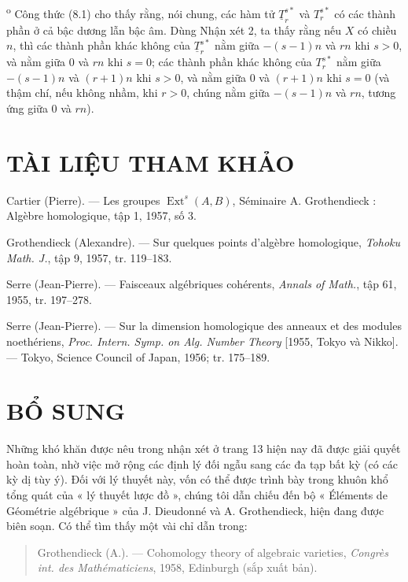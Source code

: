 \documentclass[11pt,twoside,openany]{book}
\numberwithin{equation}{section}
\newcommand{\src}[1]{%
  \phantomsection\hypertarget{src:\fgasourceid:#1}{}%
  \marginpar{\raggedleft\footnotesize\sffamily #1}%
}
\newcommand{\fgasourceid}{unset}
\begin{document}
\medskip
{}\textsuperscript{o} Công thức (8.1) cho thấy rằng, nói chung, các
hàm tử $\underline{T}_{r}^{s*}$ và $T_{r}^{s*}$ có các thành phần ở cả bậc
dương lẫn bậc âm. Dùng Nhận xét 2, ta thấy rằng nếu $X$ có chiều $n$, thì các
thành phần khác không của $\underline{T}_{r}^{s*}$ nằm giữa $-(s-1)n$ và $rn$
khi $s>0$, và nằm giữa $0$ và $rn$ khi $s=0$; các thành phần khác không của
$T_{r}^{s*}$ nằm giữa $-(s-1)n$ và $(r+1)n$ khi $s>0$, và nằm giữa $0$ và
$(r+1)n$ khi $s=0$ (và thậm chí, nếu không nhầm, khi $r>0$, chúng nằm giữa
$-(s-1)n$ và $rn$, tương ứng giữa $0$ và $rn$).

\section*{TÀI LIỆU THAM KHẢO}

\noindent[1] Cartier (Pierre). --- Les groupes
$\operatorname{Ext}^{s}(A,B)$, Séminaire A. Grothendieck : Algèbre homologique,
tập 1, 1957, số 3.

\noindent[2] Grothendieck (Alexandre). --- Sur quelques points d'algèbre
homologique, \emph{Tohoku Math. J.}, tập 9, 1957, tr. 119--183.

\noindent[3] Serre (Jean-Pierre). --- Faisceaux algébriques cohérents,
\emph{Annals of Math.}, tập 61, 1955, tr. 197--278.

\noindent[4] Serre (Jean-Pierre). --- Sur la dimension homologique des anneaux
et des modules noethériens, \emph{Proc. Intern. Symp. on Alg. Number Theory}
[1955, Tokyo và Nikko]. --- Tokyo, Science Council of Japan, 1956;
tr. 175--189.

\clearpage

\src{193}
\section*{BỔ SUNG}

Những khó khăn được nêu trong nhận xét ở trang 13 hiện nay đã được giải quyết
hoàn toàn, nhờ việc mở rộng các định lý đối ngẫu sang các đa tạp bất kỳ
(có các kỳ dị tùy ý). Đối với lý thuyết này, vốn có thể được trình bày trong
khuôn khổ tổng quát của « lý thuyết lược đồ », chúng tôi dẫn chiếu đến bộ
« Éléments de Géométrie algébrique » của J. Dieudonné và A. Grothendieck,
hiện đang được biên soạn. Có thể tìm thấy một vài chỉ dẫn trong:

\begin{quote}
Grothendieck (A.). --- Cohomology theory of algebraic varieties,
\emph{Congrès int. des Mathématiciens}, 1958, Edinburgh (sắp xuất bản).
\end{quote}
\end{document}
